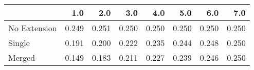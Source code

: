 \begin{tabular}{lrrrrrrr}
\toprule
{} &   1.0 &   2.0 &   3.0 &   4.0 &   5.0 &   6.0 &   7.0 \\
\midrule
No Extension & 0.249 & 0.251 & 0.250 & 0.250 & 0.250 & 0.250 & 0.250 \\
Single       & 0.191 & 0.200 & 0.222 & 0.235 & 0.244 & 0.248 & 0.250 \\
Merged       & 0.149 & 0.183 & 0.211 & 0.227 & 0.239 & 0.246 & 0.250 \\
\bottomrule
\end{tabular}
